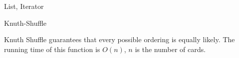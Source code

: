 \begin{homeworkProblem}{List, Iterator}
    \pending


    \begin{algorithm}[]
        \begin{algorithmic}[1]
            \EndFor
            \EndFunction{}
        \end{algorithmic}
        \caption{Knuth-Shuffle}
    \end{algorithm}

    Knuth Shuffle guarantees that every possible ordering is equally likely. The running time
    of this function is $O(n)$, $n$ is the number of cards.


\end{homeworkProblem}

